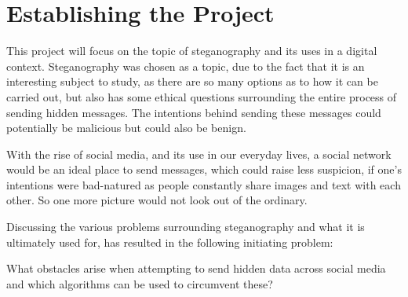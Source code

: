\section{Establishing the Project}
This project will focus on the topic of steganography and its uses in a digital context. 
Steganography was chosen as a topic, due to the fact that it is an interesting subject to study, as there are so many options as to how it can be carried out, but also has some ethical questions surrounding the entire process of sending hidden messages. 
The intentions behind sending these messages could potentially be malicious but could also be benign.

With the rise of social media, and its use in our everyday lives, a social network would be an ideal place to send messages, which could raise less suspicion, if one's intentions were bad-natured as people constantly share images and text with each other.
So one more picture would not look out of the ordinary.

Discussing the various problems surrounding steganography and what it is ultimately used for, has resulted in the following initiating problem:
\begin{tcolorbox}
What obstacles arise when attempting to send hidden data across social media and which algorithms can be used to circumvent these?
\end{tcolorbox}
